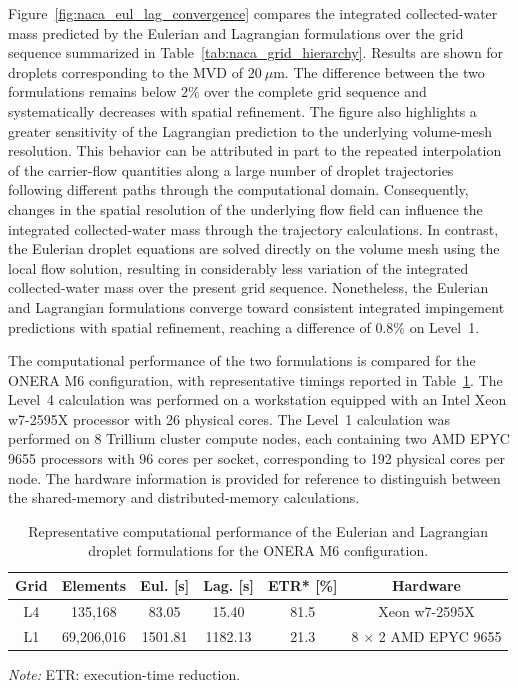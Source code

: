 Figure~\ref{fig:naca_eul_lag_convergence} compares the integrated collected-water mass predicted by the Eulerian and Lagrangian formulations over the grid sequence summarized in Table~\ref{tab:naca_grid_hierarchy}. Results are shown for droplets corresponding to the MVD of $20~\mu$m. The difference between the two formulations remains below $2\%$ over the complete grid sequence and systematically decreases with spatial refinement. The figure also highlights a greater sensitivity of the Lagrangian prediction to the underlying volume-mesh resolution. This behavior can be attributed in part to the repeated interpolation of the carrier-flow quantities along a large number of droplet trajectories following different paths through the computational domain. Consequently, changes in the spatial resolution of the underlying flow field can influence the integrated collected-water mass through the trajectory calculations. In contrast, the Eulerian droplet equations are solved directly on the volume mesh using the local flow solution, resulting in considerably less variation of the integrated collected-water mass over the present grid sequence. Nonetheless, the Eulerian and Lagrangian formulations converge toward consistent integrated impingement predictions with spatial refinement, reaching a difference of $0.8\%$ on Level~1.

The computational performance of the two formulations is compared for the ONERA M6 configuration, with representative timings reported in Table~\ref{tab:m6_eul_lag_performance}. The Level~4 calculation was performed on a workstation equipped with an Intel Xeon w7-2595X processor with 26 physical cores. The Level~1 calculation was performed on 8 Trillium cluster compute nodes, each containing two AMD EPYC 9655 processors with 96 cores per socket, corresponding to 192 physical cores per node. The hardware information is provided for reference to distinguish between the shared-memory and distributed-memory calculations.

\begin{table}[htbp]
\centering
\caption{Representative computational performance of the Eulerian and Lagrangian droplet formulations for the ONERA M6 configuration.}
\label{tab:m6_eul_lag_performance}
\begin{tabular}{cccccc}
\hline \hline
Grid &
Elements &
Eul. [s] &
Lag. [s] &
ETR* [\%] &
Hardware \\
\hline
L4 &
135,168 &
83.05 &
15.40 &
81.5 &
Xeon w7-2595X \\
L1 &
69,206,016 &
1501.81 &
1182.13 &
21.3 &
8 $\times$ 2 AMD EPYC 9655 \\
\hline \hline
\end{tabular}

\begin{minipage}{\textwidth}
\raggedright
\footnotesize
\textit{Note:} ETR: execution-time reduction.
\end{minipage}

\end{table}

